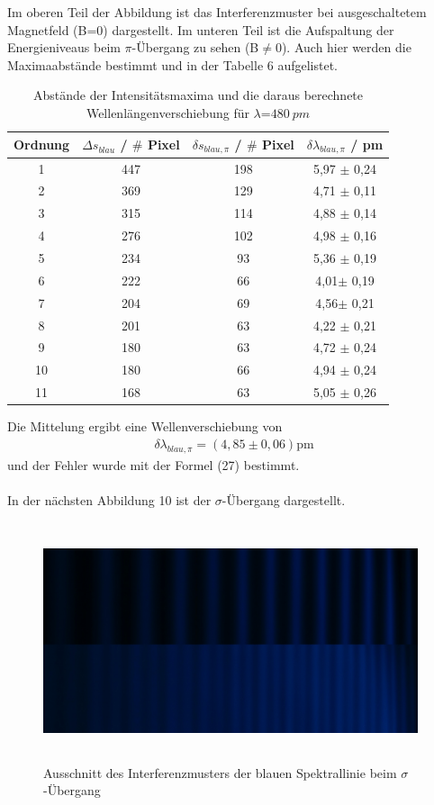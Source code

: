 \documentclass{article}
\begin{document}
Im oberen Teil der Abbildung ist das Interferenzmuster bei ausgeschaltetem Magnetfeld (B=0) dargestellt. Im unteren Teil ist die Aufspaltung der Energieniveaus beim $\pi$-Übergang zu sehen (B$\ne$0). Auch hier werden die Maximaabstände bestimmt und in der Tabelle 6 aufgelistet. 
\begin{table} [H]
	\centering
	\caption{Abstände der Intensitätsmaxima und die daraus berechnete Wellenlängenverschiebung für $\lambda$=$\SI{480}{pm}$}
	\label {tab:threecols}
	\begin{tabular}{c|c|c|c} \hline		
		Ordnung & $\Delta s_{blau}$ / $\#$ Pixel& $\delta s_{blau,\pi}$ / $\#$ Pixel& $\delta\lambda_{blau,\pi}$ / pm \\ 
		\hline 
		1 & 447& 198& 5,97 $\pm$ 0,24 \\
		2 & 369 & 129& 4,71 $\pm$ 0,11 \\
		3 & 315 & 114 & 4,88 $\pm$ 0,14 \\
		4 & 276& 102& 4,98 $\pm$ 0,16 \\
		5 & 234& 93& 5,36 $\pm$ 0,19 \\
		6 & 222& 66& 4,01$\pm$ 0,19 \\
		7 & 204& 69& 4,56$\pm$ 0,21\\
		8 & 201& 63& 4,22 $\pm$ 0,21 \\
		9 & 180& 63& 4,72 $\pm$ 0,24 \\
		10 & 180& 66& 4,94 $\pm$ 0,24\\
		11 & 168& 63& 5,05 $\pm$ 0,26 \\
		
		
		\hline
	\end{tabular} 	
	
	\label {tab:threecols}
\end{table}
Die Mittelung ergibt eine Wellenverschiebung von 
\begin{align*}
\delta\lambda_{blau,\pi}=(4,85\pm0,06)\text{pm}
\end{align*}
und der Fehler wurde mit der Formel (27) bestimmt. \\\\
In der nächsten Abbildung 10 ist der $\sigma$-Übergang dargestellt. 
\begin{figure}[H]
	\centering
	\includegraphics[height=7cm,width=11cm]{vergleichblaue2linie.jpg}
	\caption{ Ausschnitt des Interferenzmusters der blauen Spektrallinie beim $\sigma$-Übergang}
	\label{fig: abb. 1}
\end{figure} 
\end{document}

